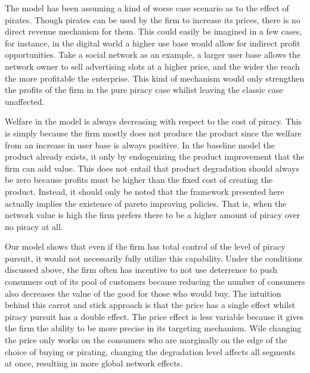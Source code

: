 \documentclass[12pt]{report}
\numberwithin{equation}{section}
\begin{document}
The model has been assuming a kind of worse case scenario as to the effect of pirates. Though pirates can be used by the firm to increase its prices, there is no direct revenue mechanism for them. This could easily be imagined in a few cases, for instance, in the digital world a higher use base would allow for indirect profit opportunities. Take a social network as an example, a larger user base allows the network owner to sell advertising slots at a higher price, and the wider the reach the more profitable the enterprise. This kind of mechanism would only strengthen the profits of the firm in the pure piracy case whilist leaving the classic case unaffected. 

Welfare in the model is always decreasing with respect to the cost of piracy. This is simply because the firm mostly does not produce the product since the welfare from an increase in user base is always positive. In the baseline model the product already exists, it only by endogenizing the product improvement that the firm can add value. This does not entail that product degradation should always be zero because profits must be higher than the fixed cost of creating the product. Instead, it should only be noted that the framework presented here actually implies the existence of pareto improving policies. That is, when the network value is high the firm prefers there to be a higher amount of piracy over no piracy at all. 


Our model shows that even if the firm has total control of the level of piracy pursuit, it would not necessarily fully utilize this capability. Under the conditions discussed above, the firm often has incentive to not use deterrence to push consumers out of its pool of customers because reducing the number of consumers also decreases the value of the good for those who would buy. The intuition behind this carrot and stick approach is that the price has a single effect whilst piracy pursuit has a double effect. The price effect is less variable because it gives the firm the ability to be more precise in its targeting mechanism. Wile changing the price only works on the consumers who are marginally on the edge of the choice of buying or pirating, changing the degradation level affects all segments at once, resulting in more global network effects. 
\end{document}
